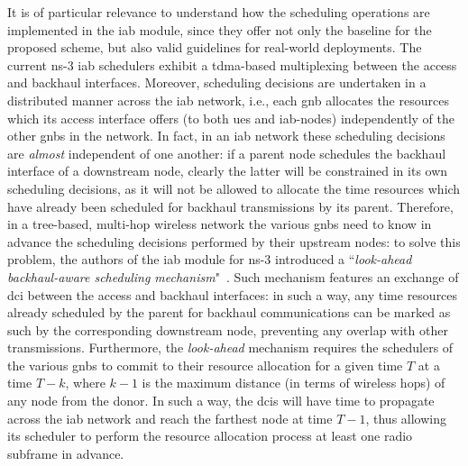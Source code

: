 It is of particular relevance to understand how the scheduling operations are implemented in the \gls{iab} module, since they offer not only the baseline for the proposed scheme, but also valid guidelines for real-world deployments. 
The current ns-3 \gls{iab} schedulers exhibit a \gls{tdma}-based multiplexing between the access and backhaul interfaces. Moreover, scheduling decisions are undertaken in a distributed manner across the \gls{iab} network, i.e., each \gls{gnb} allocates the resources which its access interface offers (to both \gls{ue}s and  \gls{iab}-nodes) independently of the other \gls{gnb}s in the network. 
In fact, in an \gls{iab} network these scheduling decisions are \textit{almost} independent of one another: if a parent node schedules the backhaul interface of a downstream node, clearly the latter will be constrained in its own scheduling decisions, as it will not be allowed to allocate the time resources which have already been scheduled for backhaul transmissions by its parent. Therefore, in a tree-based, multi-hop wireless network the various \glspl{gnb} need to know in advance the scheduling decisions performed by their upstream nodes: to solve this problem, the authors of the \gls{iab} module for ns-3 introduced a ``\textit{look-ahead backhaul-aware scheduling mechanism}"~\cite{polese2018end}. 
Such mechanism features an exchange of \gls{dci} between the access and backhaul interfaces: in such a way, any time resources already scheduled by the parent for backhaul communications can be marked as such by the corresponding downstream node, preventing any overlap with other transmissions.
Furthermore, the \textit{look-ahead} mechanism requires the schedulers of the various \gls{gnb}s to commit to their resource allocation for a given time $T$ at a time $T - k$, where $k - 1$ is the maximum distance (in terms of wireless hops) of any node from the donor. In such a way, the \gls{dci}s will have time to propagate across the \gls{iab} network and reach the farthest node at time $T - 1$, thus allowing its scheduler to perform the resource allocation process at least one radio subframe in advance.


